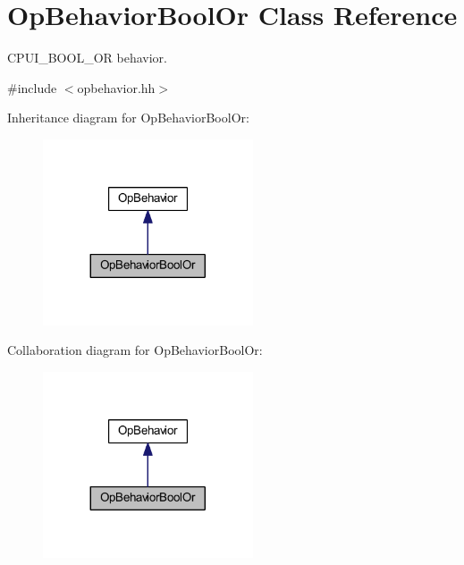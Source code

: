 \hypertarget{class_op_behavior_bool_or}{}\section{Op\+Behavior\+Bool\+Or Class Reference}
\label{class_op_behavior_bool_or}


C\+P\+U\+I\+\_\+\+B\+O\+O\+L\+\_\+\+OR behavior.  




{\ttfamily \#include $<$opbehavior.\+hh$>$}



Inheritance diagram for Op\+Behavior\+Bool\+Or\+:
\nopagebreak
\begin{figure}[H]
\begin{center}
\leavevmode
\includegraphics[width=176pt]{class_op_behavior_bool_or__inherit__graph}
\end{center}
\end{figure}


Collaboration diagram for Op\+Behavior\+Bool\+Or\+:
\nopagebreak
\begin{figure}[H]
\begin{center}
\leavevmode
\includegraphics[width=176pt]{class_op_behavior_bool_or__coll__graph}
\end{center}
\end{figure}
